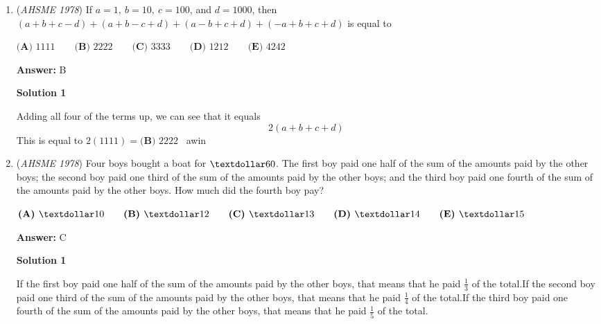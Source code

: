 \begin{enumerate}
 $\textbf{(A) }2x^2\qquad \textbf{(B) }2y^2\qquad \textbf{(C) }x^2+y^2\qquad \textbf{(D) }x^2-y^2\qquad  \textbf{(E) }y^2-x^2$

 \textbf{Answer: }D



\textbf{Solution 1}

Using substitution, we can substitute y into the equation in the first parentheses. Therefore, we'll get 
 \[\left(x-\frac{1}{\frac{1}{y}}\right)\left(y+\frac{1}{y}\right)\]

 Because $x = \frac{1}{y}$, we can also see that $y = \frac{1}{x}$. Using substitution again, we can substitute x into the second equation getting
 \[\left(x-\frac{1}{\frac{1}{y}}\right)\left(y+\frac{1}{\frac{1}{x}}\right)\]

 Simplifying, we get $(x-y)(y+x)$. Multiplying, we get $\boxed{\textbf{(D)   }x^2-y^2}$



	\item (\textit{AHSME 1978}) If $a = 1,~ b = 10, ~c = 100$, and $d = 1000$, then $(a+ b+ c-d) + (a + b- c+ d) +(a-b+ c+d)+ (-a+ b+c+d)$ is equal to


 $\textbf{(A) }1111\qquad \textbf{(B) }2222\qquad \textbf{(C) }3333\qquad \textbf{(D) }1212\qquad  \textbf{(E) }4242$

 \textbf{Answer: }B



\textbf{Solution 1}

Adding all four of the terms up, we can see that it equals 
 \[2(a+b+c+d)\]This is equal to $2(1111) = \boxed{\textbf{(B) }2222}$ ~awin

 


	\item (\textit{AHSME 1978}) Four boys bought a boat for $\textdollar 60$. The first boy paid one half of the sum of the amounts paid by the other boys; 
the second boy paid one third of the sum of the amounts paid by the other boys; 
and the third boy paid one fourth of the sum of the amounts paid by the other boys. How much did the fourth boy pay? 


 $\textbf{(A) }\textdollar 10\qquad \textbf{(B) }\textdollar 12\qquad \textbf{(C) }\textdollar 13\qquad \textbf{(D) }\textdollar 14\qquad \textbf{(E) }\textdollar 15$

 \textbf{Answer: }C



\textbf{Solution 1}

If the first boy paid one half of the sum of the amounts paid by the other boys, that means that he paid $\frac{1}{3}$ of the total.If the second boy paid one third of the sum of the amounts paid by the other boys, that means that he paid $\frac{1}{4}$ of the total.If the third boy paid one fourth of the sum of the  amounts paid by the other boys, that means that he paid $\frac{1}{5}$ of the total. 


\end{enumerate}
